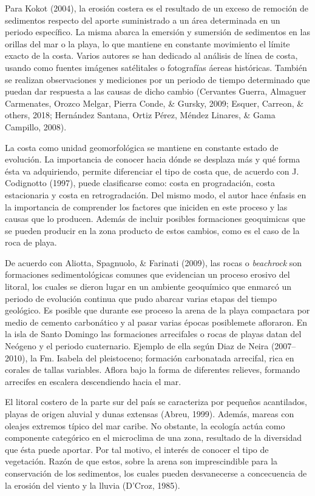 \documentclass[11pt,]{article}
\begin{document}
Para Kokot (2004), la erosión costera es el resultado de un exceso de
remoción de sedimentos respecto del aporte suministrado a un área
determinada en un periodo específico. La misma abarca la emersión y
sumersión de sedimentos en las orillas del mar o la playa, lo que
mantiene en constante movimiento el límite exacto de la costa. Varios
autores se han dedicado al análisis de línea de costa, usando como
fuentes imágenes satélitales o fotografías áereas históricas. También se
realizan observaciones y mediciones por un periodo de tiempo determinado
que puedan dar respuesta a las causas de dicho cambio (Cervantes Guerra,
Almaguer Carmenates, Orozco Melgar, Pierra Conde, \& Gursky, 2009;
Esquer, Carreon, \& others, 2018; Hernández Santana, Ortiz Pérez, Méndez
Linares, \& Gama Campillo, 2008).

La costa como unidad geomorfológica se mantiene en constante estado de
evolución. La importancia de conocer hacia dónde se desplaza más y qué
forma ésta va adquiriendo, permite diferenciar el tipo de costa que, de
acuerdo con J. Codignotto (1997), puede clasificarse como: costa en
progradación, costa estacionaria y costa en retrogradación. Del mismo
modo, el autor hace énfasis en la importancia de comprender los factores
que iniciden en este proceso y las causas que lo producen. Además de
incluir posibles formaciones geoquimicas que se pueden producir en la
zona producto de estos cambios, como es el caso de la roca de playa.

De acuerdo con Aliotta, Spagnuolo, \& Farinati (2009), las rocas o
\emph{beachrock} son formaciones sedimentológicas comunes que evidencian
un proceso erosivo del litoral, los cuales se dieron lugar en un
ambiente geoquímico que enmarcó un periodo de evolución continua que
pudo abarcar varias etapas del tiempo geológico. Es posible que durante
ese proceso la arena de la playa compactara por medio de cemento
carbonático y al pasar varias épocas posiblemete afloraron. En la isla
de Santo Domingo las formaciones arrecifales o rocas de playas datan del
Neógeno y el periodo cuaternario. Ejemplo de ella según Diaz de Neira
(2007--2010), la Fm. Isabela del pleistoceno; formación carbonatada
arrecifal, rica en corales de tallas variables. Aflora bajo la forma de
diferentes relieves, formando arrecifes en escalera descendiendo hacia
el mar.

El litoral costero de la parte sur del país se caracteriza por pequeños
acantilados, playas de origen aluvial y dunas extensas (Abreu, 1999).
Además, mareas con oleajes extremos típico del mar caribe. No obstante,
la ecología actúa como componente categórico en el microclima de una
zona, resultado de la diversidad que ésta puede aportar. Por tal motivo,
el interés de conocer el tipo de vegetación. Razón de que estos, sobre
la arena son imprescindible para la conservación de los sedimentos, los
cuales pueden desvanecerse a concecuencia de la erosión del viento y la
lluvia (D'Croz, 1985).
\end{document}
